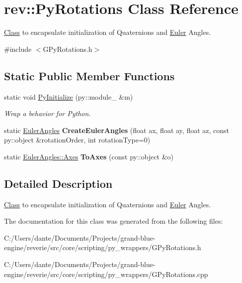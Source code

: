 \hypertarget{classrev_1_1_py_rotations}{}\section{rev\+::Py\+Rotations Class Reference}
\label{classrev_1_1_py_rotations}


\mbox{\hyperlink{struct_class}{Class}} to encapsulate initialization of Quaternions and \mbox{\hyperlink{class_euler}{Euler}} Angles.  




{\ttfamily \#include $<$G\+Py\+Rotations.\+h$>$}

\subsection*{Static Public Member Functions}
\begin{DoxyCompactItemize}
\item 
\mbox{\label{classrev_1_1_py_rotations_a69163d43df196b94847029a775ea0e00}} 
static void \mbox{\hyperlink{classrev_1_1_py_rotations_a69163d43df196b94847029a775ea0e00}{Py\+Initialize}} (py\+::module\+\_\+ \&m)
\begin{DoxyCompactList}\small\item\em Wrap a behavior for Python. \end{DoxyCompactList}\item 
\mbox{\label{classrev_1_1_py_rotations_a883b697090b1b17d218c5674bb5ef928}} 
static \mbox{\hyperlink{classrev_1_1_euler_angles}{Euler\+Angles}} {\bfseries Create\+Euler\+Angles} (float ax, float ay, float az, const py\+::object \&rotation\+Order, int rotation\+Type=0)
\item 
\mbox{\label{classrev_1_1_py_rotations_a2c7623f2574c03a73b48d5cf7c49ca59}} 
static \mbox{\hyperlink{classrev_1_1_vector}{Euler\+Angles\+::\+Axes}} {\bfseries To\+Axes} (const py\+::object \&o)
\end{DoxyCompactItemize}


\subsection{Detailed Description}
\mbox{\hyperlink{struct_class}{Class}} to encapsulate initialization of Quaternions and \mbox{\hyperlink{class_euler}{Euler}} Angles. 

The documentation for this class was generated from the following files\+:\begin{DoxyCompactItemize}
\item 
C\+:/\+Users/dante/\+Documents/\+Projects/grand-\/blue-\/engine/reverie/src/core/scripting/py\+\_\+wrappers/G\+Py\+Rotations.\+h\item 
C\+:/\+Users/dante/\+Documents/\+Projects/grand-\/blue-\/engine/reverie/src/core/scripting/py\+\_\+wrappers/G\+Py\+Rotations.\+cpp\end{DoxyCompactItemize}
